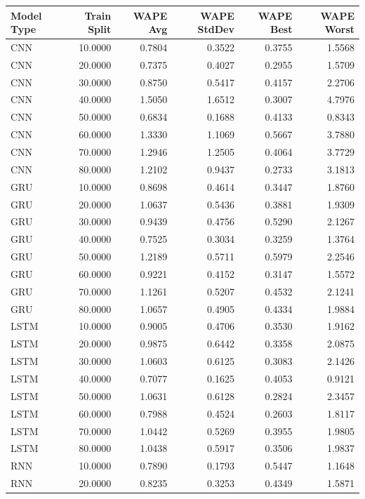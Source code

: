 \begin{tabular}{lrrrrr}
\toprule
Model Type & Train Split & WAPE Avg & WAPE StdDev & WAPE Best & WAPE Worst \\
\midrule
CNN & 10.0000 & 0.7804 & 0.3522 & 0.3755 & 1.5568 \\
CNN & 20.0000 & 0.7375 & 0.4027 & 0.2955 & 1.5709 \\
CNN & 30.0000 & 0.8750 & 0.5417 & 0.4157 & 2.2706 \\
CNN & 40.0000 & 1.5050 & 1.6512 & 0.3007 & 4.7976 \\
CNN & 50.0000 & 0.6834 & 0.1688 & 0.4133 & 0.8343 \\
CNN & 60.0000 & 1.3330 & 1.1069 & 0.5667 & 3.7880 \\
CNN & 70.0000 & 1.2946 & 1.2505 & 0.4064 & 3.7729 \\
CNN & 80.0000 & 1.2102 & 0.9437 & 0.2733 & 3.1813 \\
GRU & 10.0000 & 0.8698 & 0.4614 & 0.3447 & 1.8760 \\
GRU & 20.0000 & 1.0637 & 0.5436 & 0.3881 & 1.9309 \\
GRU & 30.0000 & 0.9439 & 0.4756 & 0.5290 & 2.1267 \\
GRU & 40.0000 & 0.7525 & 0.3034 & 0.3259 & 1.3764 \\
GRU & 50.0000 & 1.2189 & 0.5711 & 0.5979 & 2.2546 \\
GRU & 60.0000 & 0.9221 & 0.4152 & 0.3147 & 1.5572 \\
GRU & 70.0000 & 1.1261 & 0.5207 & 0.4532 & 2.1241 \\
GRU & 80.0000 & 1.0657 & 0.4905 & 0.4334 & 1.9884 \\
LSTM & 10.0000 & 0.9005 & 0.4706 & 0.3530 & 1.9162 \\
LSTM & 20.0000 & 0.9875 & 0.6442 & 0.3358 & 2.0875 \\
LSTM & 30.0000 & 1.0603 & 0.6125 & 0.3083 & 2.1426 \\
LSTM & 40.0000 & 0.7077 & 0.1625 & 0.4053 & 0.9121 \\
LSTM & 50.0000 & 1.0631 & 0.6128 & 0.2824 & 2.3457 \\
LSTM & 60.0000 & 0.7988 & 0.4524 & 0.2603 & 1.8117 \\
LSTM & 70.0000 & 1.0442 & 0.5269 & 0.3955 & 1.9805 \\
LSTM & 80.0000 & 1.0438 & 0.5917 & 0.3506 & 1.9837 \\
RNN & 10.0000 & 0.7890 & 0.1793 & 0.5447 & 1.1648 \\
RNN & 20.0000 & 0.8235 & 0.3253 & 0.4349 & 1.5871 \\

\end{tabular}
